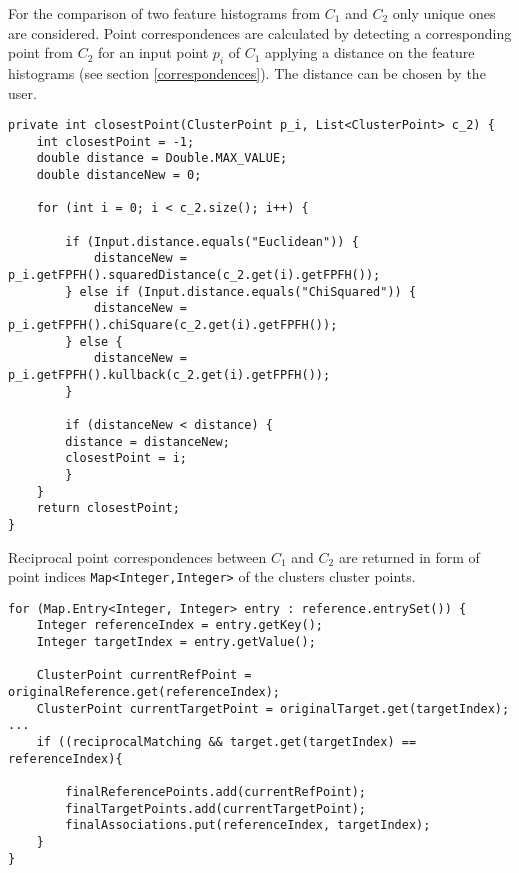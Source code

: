 For the comparison of two feature histograms from $C_1$ and $C_2$ only unique ones are considered. Point correspondences are calculated by detecting a corresponding point from $C_2$ for an input point $p_i$ of $C_1$ applying a distance on the feature histograms (see section \ref{correspondences}). The distance can be chosen by the user.
\begin{lstlisting}
private int closestPoint(ClusterPoint p_i, List<ClusterPoint> c_2) {
	int closestPoint = -1;
	double distance = Double.MAX_VALUE;
	double distanceNew = 0;
	
	for (int i = 0; i < c_2.size(); i++) {
	
		if (Input.distance.equals("Euclidean")) {
			distanceNew = p_i.getFPFH().squaredDistance(c_2.get(i).getFPFH());
		} else if (Input.distance.equals("ChiSquared")) {
			distanceNew = p_i.getFPFH().chiSquare(c_2.get(i).getFPFH());
		} else {
			distanceNew = p_i.getFPFH().kullback(c_2.get(i).getFPFH());
		}
	
		if (distanceNew < distance) {
		distance = distanceNew;
		closestPoint = i;
		}
	}
	return closestPoint;
}
\end{lstlisting}
Reciprocal point correspondences between $C_1$ and $C_2$ are returned in form of point indices \texttt{Map<Integer,Integer>}  of the clusters cluster points.
\begin{lstlisting}
for (Map.Entry<Integer, Integer> entry : reference.entrySet()) {
	Integer referenceIndex = entry.getKey();
	Integer targetIndex = entry.getValue();

	ClusterPoint currentRefPoint = originalReference.get(referenceIndex);
	ClusterPoint currentTargetPoint = originalTarget.get(targetIndex);
...
	if ((reciprocalMatching && target.get(targetIndex) == referenceIndex){

		finalReferencePoints.add(currentRefPoint);
		finalTargetPoints.add(currentTargetPoint);
		finalAssociations.put(referenceIndex, targetIndex);
	}
}
\end{lstlisting}
